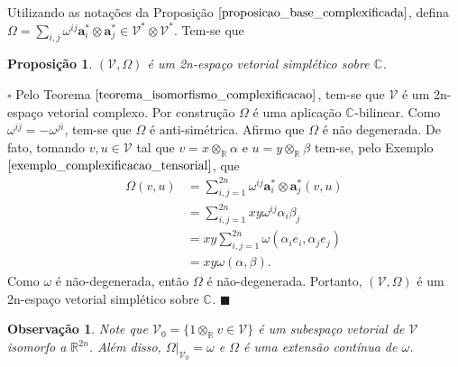 \documentclass[12pt]{book}
\newtheorem{observacao}[teorema]{Observação}
\newtheorem{proposicao}[teorema]{Proposição}
\newenvironment{prova}[1]{$\square$ #1}{\hfill$\blacksquare$}
\newcommand{\complexificado}[1]{\mathcal{#1}}
\newcommand{\complexificacaoelemento}[2]{#1\otimes_{\reta} #2}
\newcommand{\complexo}[1]{\mathbb{C}^{#1}}
\newcommand{\formaSimpletica}[2]{\omega(#1, #2)}
\newcommand{\produtotensorialabrev}[2]{#1\otimes #2}
\newcommand{\produtotensorialdual}{\produtotensorialabrev{\complexificado{V}^{*}}{\complexificado{V}^{*}}}
\newcommand{\real}[1]{\mathbb{R}^{#1}}
\newcommand{\reta}{\real{}}
\begin{document}
	Utilizando as notações da Proposição $\ref{proposicao_base_complexificada}$, defina $\Omega=\sum_{i,j}\omega^{ij}\textbf{a}^{*}_{i}\otimes \textbf{a}^{*}_{j} \in \produtotensorialdual$. Tem-se que
	
	\begin{proposicao} $(\complexificado{V}, \Omega)$ é um 2n-espaço vetorial simplético sobre $\complexo{}$.
	\end{proposicao}\label{proposicao_complexificacao_espaco_simpletico}
	\begin{prova}
		Pelo Teorema $\ref{teorema_isomorfismo_complexificacao}$, tem-se que $\complexificado{V}$ é um 2n-espaço vetorial complexo. Por construção $\Omega$ é uma aplicação $\complexo{}$-bilinear. Como $\omega^{ij}  = -\omega^{ji} $, tem-se que $\Omega$ é anti-simétrica. Afirmo que $\Omega$ é não degenerada. De fato, tomando $v, u \in \complexificado{V}$ tal que $v= \complexificacaoelemento{x}{\alpha}$ e $u=\complexificacaoelemento{y}{\beta} $ tem-se, pelo Exemplo $\ref{exemplo_complexificacao_tensorial}$, que 
		$$
		\begin{aligned}
		\Omega(v,u) &= \sum_{i,j = 1}^{2n}
		\omega^{ij}\textbf{a}^{*}_{i}\otimes \textbf{a}^{*}_{j}(v,u)
		\\
		&= \sum_{i,j = 1}^{2n}
		xy\omega^{ij}\alpha_{i}\beta_{j}
		\\
		&= xy\sum_{i,j = 1}^{2n}
		\formaSimpletica{\alpha_{i}e_{i}}{\alpha_{j}e_{j}}
		\\
		&= xy\formaSimpletica{\alpha}{\beta}.
		\end{aligned}
		$$
		Como $\omega$ é não-degenerada, então $\Omega$ é não-degenerada. Portanto, $(\complexificado{V}, \Omega)$ é um 2n-espaço vetorial simplético sobre $\complexo{}$.
	\end{prova}
	
	\begin{observacao}
		Note que $\complexificado{V}_{0} = \{\complexificacaoelemento{1}{v} \in \complexificado{V} \}$ é um subespaço vetorial de $\complexificado{V}$ isomorfo a $\real{2n}$. Além disso, $\Omega|_{\complexificado{V}_{0}} = \omega$ e $\Omega$ é uma extensão contínua de $\omega$.
	\end{observacao}
	
\end{document}
